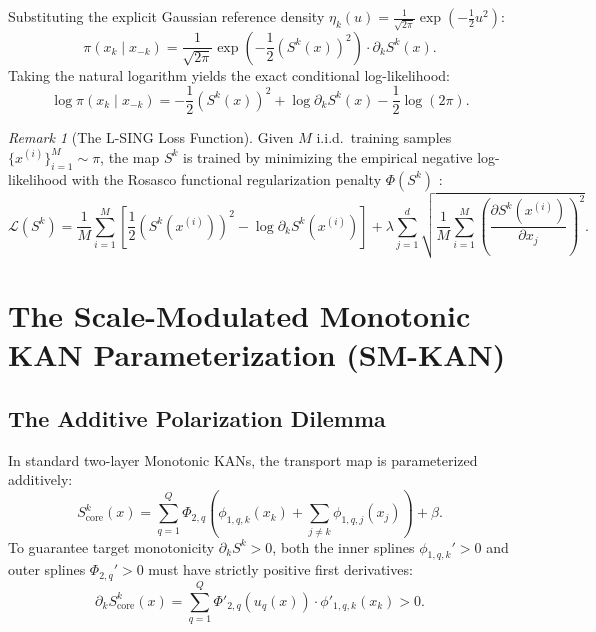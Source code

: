 \documentclass[11pt,a4paper]{article}
\theoremstyle{plain}
\theoremstyle{definition}
\theoremstyle{remark}
\newtheorem{remark}[theorem]{Remark}
\begin{document}
Substituting the explicit Gaussian reference density $\eta_k(u) = \frac{1}{\sqrt{2\pi}} \exp\left(-\frac{1}{2} u^2\right)$:
\begin{equation}
    \pi(x_k \mid x_{-k}) = \frac{1}{\sqrt{2\pi}} \exp\left( -\frac{1}{2} (S^k(x))^2 \right) \cdot \partial_k S^k(x).
\end{equation}
Taking the natural logarithm yields the exact conditional log-likelihood:
\begin{equation}
    \log \pi(x_k \mid x_{-k}) = -\frac{1}{2} \left( S^k(x) \right)^2 + \log \partial_k S^k(x) - \frac{1}{2}\log(2\pi).
    \label{eq:exact_cond_log_likelihood}
\end{equation}

\begin{remark}[The L-SING Loss Function]
Given $M$ i.i.d.\ training samples $\{x^{(i)}\}_{i=1}^M \sim \pi$, the map $S^k$ is trained by minimizing the empirical negative log-likelihood with the Rosasco functional regularization penalty $\Phi(S^k)$ \cite{rosasco2012nonparametric}:
\begin{equation}
    \mathcal{L}(S^k) = \frac{1}{M} \sum_{i=1}^M \left[ \frac{1}{2} \left(S^k(x^{(i)})\right)^2 - \log \partial_k S^k(x^{(i)}) \right] + \lambda \sum_{j=1}^d \sqrt{ \frac{1}{M} \sum_{i=1}^M \left( \frac{\partial S^k(x^{(i)})}{\partial x_j} \right)^2 }.
    \label{eq:lsing_training_loss}
\end{equation}
\end{remark}

\section{The Scale-Modulated Monotonic KAN Parameterization (SM-KAN)}

\subsection{The Additive Polarization Dilemma}

In standard two-layer Monotonic KANs, the transport map is parameterized additively:
\begin{equation}
    S^k_{\text{core}}(x) = \sum_{q=1}^Q \Phi_{2, q}\left( \phi_{1, q, k}(x_k) + \sum_{j \neq k} \phi_{1, q, j}(x_j) \right) + \beta.
    \label{eq:additive_kan_core}
\end{equation}
To guarantee target monotonicity $\partial_k S^k > 0$, both the inner splines $\phi_{1, q, k}' > 0$ and outer splines $\Phi_{2, q}' > 0$ must have strictly positive first derivatives:
\begin{equation}
    \partial_k S^k_{\text{core}}(x) = \sum_{q=1}^Q \Phi'_{2, q}(u_q(x)) \cdot \phi'_{1, q, k}(x_k) > 0.
\end{equation}
\end{document}
